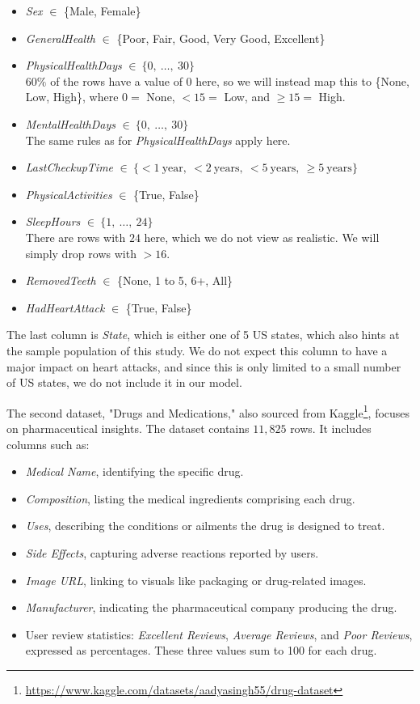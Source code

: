 \documentclass{article}
\begin{document}
\begin{itemize}
    \item \textit{Sex} $\in$ \{Male, Female\}
    \item \textit{GeneralHealth} $\in$ \{Poor, Fair, Good, Very Good, Excellent\}
    \item \textit{PhysicalHealthDays} $\in\ \{ 0,\ \dots,\ 30 \}$\\
    $60\%$ of the rows have a value of $0$ here, so we will instead map this to
    \{None, Low, High\}, where $0 = $ None, $<15 = $ Low, and $\geq15 =$ High.
    \item \textit{MentalHealthDays}  $\in\ \{ 0,\ \dots,\ 30 \}$\\
    The same rules as for \textit{PhysicalHealthDays} apply here.
    \item \textit{LastCheckupTime} $\in\ \{<1\ \text{year},\ <2\ \text{years},\ <5\ \text{years},\ \geq 5\ \text{years}\}$
    \item \textit{PhysicalActivities} $\in$ \{True, False\}
    \item \textit{SleepHours}  $\in\ \{ 1,\ \dots,\ 24 \}$\\
    There are rows with $24$ here, which we do not view as realistic.
    We will simply drop rows with $>16$.
    \item \textit{RemovedTeeth} $\in$ \{None, 1 to 5, 6+, All\}
    \item \textit{HadHeartAttack} $\in$ \{True, False\}
\end{itemize}

The last column is \textit{State}, which is either one of 5 US states,
which also hints at the sample population of this study.
We do not expect this column to have a major impact on heart attacks,
and since this is only limited to a small number of US states, we do not include it in our model.

The second dataset, "Drugs and Medications," also sourced from Kaggle\footnote{\url{https://www.kaggle.com/datasets/aadyasingh55/drug-dataset}},
focuses on pharmaceutical insights. The dataset contains $11,825$ rows. It includes columns such as:

\begin{itemize} 
    \item \textit{Medical Name}, identifying the specific drug. 
    \item \textit{Composition}, listing the medical ingredients comprising each drug. 
    \item \textit{Uses}, describing the conditions or ailments the drug is designed to treat. 
    \item \textit{Side Effects}, capturing adverse reactions reported by users. 
    \item \textit{Image URL}, linking to visuals like packaging or drug-related images. 
    \item \textit{Manufacturer}, indicating the pharmaceutical company producing the drug. 
    \item User review statistics: \textit{Excellent Reviews}, \textit{Average Reviews}, and \textit{Poor Reviews}, expressed as percentages. These three values sum to 100 for each drug. 
\end{itemize}
\end{document}

